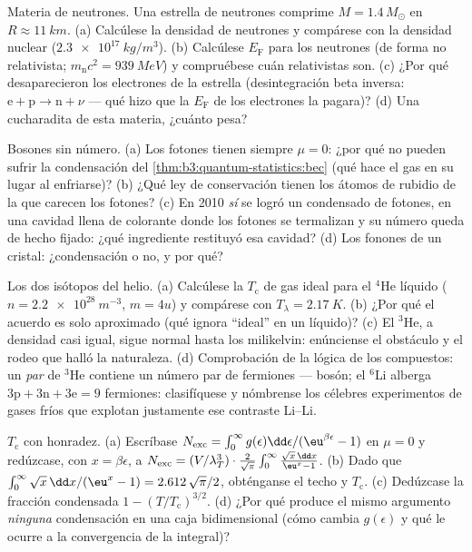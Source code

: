 \begin{exercise}[$\star\star$]\label{exo:b3:quantum-statistics:7}
Materia de neutrones. Una estrella de neutrones comprime $M = 1.4\,M_\odot$ en $R
\approx \qty{11}{km}$. (a) Calcúlese la densidad de neutrones y compárese
con la densidad nuclear ($\qty{2.3e17}{kg/m^3}$). (b) Calcúlese
$E_{\text{F}}$ para los neutrones (de forma no relativista; $m_{\text{n}}c^2
= \qty{939}{MeV}$) y compruébese cuán relativistas son. (c) ¿Por qué
desaparecieron los electrones de la estrella (desintegración beta inversa:
$\text{e} + \text{p} \to \text{n} + \nu$ --- qué hizo que la
$E_{\text{F}}$ de los electrones la pagara)? (d) Una cucharadita de esta
materia, ¿cuánto pesa?
\end{exercise}

\begin{exercise}[$\star\star$]\label{exo:b3:quantum-statistics:8}
Bosones sin número. (a) Los fotones tienen siempre $\mu = 0$: ¿por qué no
pueden sufrir la condensación del
\cref{thm:b3:quantum-statistics:bec} (qué hace el gas en su lugar
al enfriarse)? (b) ¿Qué ley de conservación tienen los átomos de rubidio
de la que carecen los fotones? (c) En 2010 \emph{sí} se logró un condensado
de fotones, en una cavidad llena de colorante donde los fotones se termalizan
y su número queda de hecho fijado: ¿qué ingrediente restituyó esa cavidad?
(d) Los fonones de un cristal: ¿condensación o no, y por qué?
\end{exercise}

\begin{exercise}[$\star\star$]\label{exo:b3:quantum-statistics:9}
Los dos isótopos del helio. (a) Calcúlese la $T_{\text{c}}$ de gas ideal
para el $^4$He líquido ($n = \qty{2.2e28}{m^{-3}}$, $m = 4u$) y
compárese con $T_\lambda = \qty{2.17}{K}$. (b) ¿Por qué el acuerdo es
solo aproximado (qué ignora ``ideal'' en un líquido)? (c) El $^3$He, a
densidad casi igual, sigue normal hasta los milikelvin: enúnciense
el obstáculo y el rodeo que halló la naturaleza. (d) Comprobación de la lógica de los compuestos: un \emph{par} de $^3$He contiene un número
par de fermiones --- bosón; el $^6$Li alberga $3\text{p} + 3\text{n}
+ 3\text{e} = 9$ fermiones: clasifíquese y nómbrense los célebres
experimentos de gases fríos que explotan justamente ese contraste Li--Li.
\end{exercise}

\begin{exercise}[$\star\star\star$]\label{exo:b3:quantum-statistics:10}
$T_{\text{c}}$ con honradez. (a) Escríbase $N_{\text{exc}} = \int_0^\infty
g(\epsilon)\dd\epsilon/(\eu^{\beta\epsilon} - 1)$ en $\mu = 0$ y
redúzcase, con $x = \beta\epsilon$, a $N_{\text{exc}} =
(V/\lambda_T^3)\cdot\frac{2}{\sqrt\pi}\int_0^\infty\frac{\sqrt
x\,\dd x}{\eu^x - 1}$. (b) Dado que $\int_0^\infty\sqrt x\,\dd x/(
\eu^x - 1) = 2.612\,\sqrt\pi/2$, obténganse el techo y
$T_{\text{c}}$. (c) Dedúzcase la fracción condensada $1 -
(T/T_{\text{c}})^{3/2}$. (d) ¿Por qué produce el mismo argumento
\emph{ninguna} condensación en una caja bidimensional (cómo cambia $g(
\epsilon)$ y qué le ocurre a la convergencia de la
integral)?
\end{exercise}

